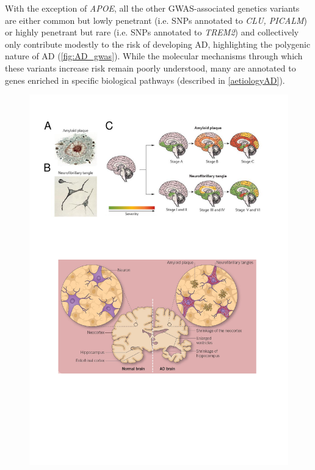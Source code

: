 With the exception of \textit{APOE}, all the other GWAS-associated genetics variants are either common but lowly penetrant (i.e. SNPs annotated to \textit{CLU, PICALM}) or highly penetrant but rare (i.e. SNPs annotated to \textit{TREM2}) and collectively only contribute modestly to the risk of developing AD, highlighting the polygenic nature of AD (\cref{fig:AD_gwas}). While the molecular mechanisms through which these variants increase risk remain poorly understood, many are annotated to genes enriched in specific biological pathways (described in \cref{aetiologyAD}). 


\begin{landscape}
	\begin{figure}[!htp]
		\centering
		\includegraphics[page=11,trim={0 17cm 0cm 1cm},clip, scale = 1.2]{Figures/Introduction_Figures.pdf}
		\captionsetup{width=1.6\textwidth,singlelinecheck=off}

\end{figure}
\end{landscape}
